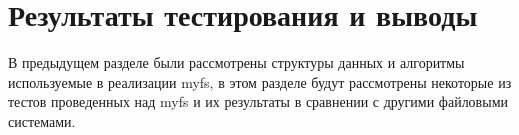 \chapter{Результаты тестирования и выводы}

В предыдущем разделе были рассмотрены структуры данных и алгоритмы используемые
в реализации myfs, в этом разделе будут рассмотрены некоторые из тестов
проведенных над myfs и их результаты в сравнении с другими файловыми системами.




